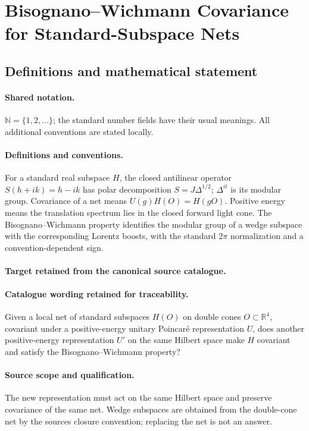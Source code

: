 \documentclass[11pt]{article}
\begin{document}
\section{Bisognano–Wichmann Covariance for Standard-Subspace Nets}\label{statement}

\subsection{Definitions and mathematical statement}

\paragraph{Shared notation.}$\mathbb N=\{1,2,\ldots\}$; the standard number fields have their usual meanings. All additional conventions are stated locally.


\paragraph{Definitions and conventions.}
For a standard real subspace $H$, the closed antilinear operator $S(h+ik)=h-ik$ has polar decomposition $S=J\Delta^{1/2}$; $\Delta^{it}$ is its modular group. Covariance of a net means $U(g)H(O)=H(gO)$. Positive energy means the translation spectrum lies in the closed forward light cone. The Bisognano--Wichmann property identifies the modular group of a wedge subspace with the corresponding Lorentz boosts, with the standard $2\pi$ normalization and a convention-dependent sign.

\paragraph{Target retained from the canonical source catalogue.}
\paragraph{Catalogue wording retained for traceability.}
Given a local net of standard subspaces $H(O)$ on double cones $O\subset\mathbb R^4$, covariant under a positive-energy unitary Poincaré representation $U$, does another positive-energy representation $U'$ on the same Hilbert space make $H$ covariant and satisfy the Bisognano–Wichmann property?

\paragraph{Source scope and qualification.}
The new representation must act on the same Hilbert space and preserve covariance of the same net. Wedge subspaces are obtained from the double-cone net by the source\textquotesingle s closure convention; replacing the net is not an answer.
\end{document}
